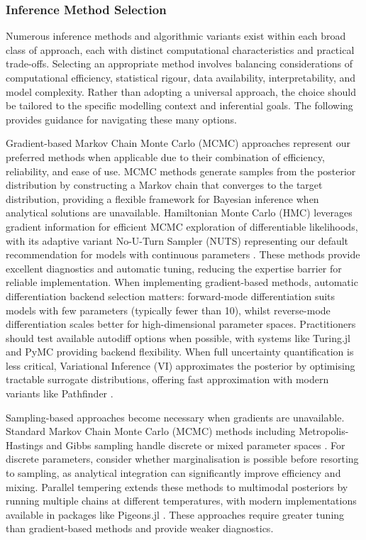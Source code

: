 \documentclass{article}
\begin{document}
\subsubsection{Inference Method Selection}

Numerous inference methods and algorithmic variants exist within each broad class of approach, each with distinct computational characteristics and practical trade-offs.
Selecting an appropriate method involves balancing considerations of computational efficiency, statistical rigour, data availability, interpretability, and model complexity.
Rather than adopting a universal approach, the choice should be tailored to the specific modelling context and inferential goals.
The following provides guidance for navigating these many options.

Gradient-based Markov Chain Monte Carlo (MCMC) approaches represent our preferred methods when applicable due to their combination of efficiency, reliability, and ease of use.
MCMC methods generate samples from the posterior distribution by constructing a Markov chain that converges to the target distribution, providing a flexible framework for Bayesian inference when analytical solutions are unavailable.
Hamiltonian Monte Carlo (HMC) leverages gradient information for efficient MCMC exploration of differentiable likelihoods, with its adaptive variant No-U-Turn Sampler (NUTS) representing our default recommendation for models with continuous parameters \citep{duane1987hybrid, hoffman2014no, andrade2020evaluation}.
These methods provide excellent diagnostics and automatic tuning, reducing the expertise barrier for reliable implementation.
When implementing gradient-based methods, automatic differentiation backend selection matters: forward-mode differentiation suits models with few parameters (typically fewer than 10), whilst reverse-mode differentiation scales better for high-dimensional parameter spaces.
Practitioners should test available autodiff options when possible, with systems like Turing.jl and PyMC providing backend flexibility.
When full uncertainty quantification is less critical, Variational Inference (VI) approximates the posterior by optimising tractable surrogate distributions, offering fast approximation with modern variants like Pathfinder \citep{blei2017variational, chatzilena2019contemporary}.

Sampling-based approaches become necessary when gradients are unavailable.
Standard Markov Chain Monte Carlo (MCMC) methods including Metropolis-Hastings and Gibbs sampling handle discrete or mixed parameter spaces \citep{hastings1970monte, geman1984stochastic, gilks1995markov}.
For discrete parameters, consider whether marginalisation is possible before resorting to sampling, as analytical integration can significantly improve efficiency and mixing.
Parallel tempering extends these methods to multimodal posteriors by running multiple chains at different temperatures, with modern implementations available in packages like Pigeons.jl \citep{surjanovic2023pigeons}.
These approaches require greater tuning than gradient-based methods and provide weaker diagnostics.
\end{document}
